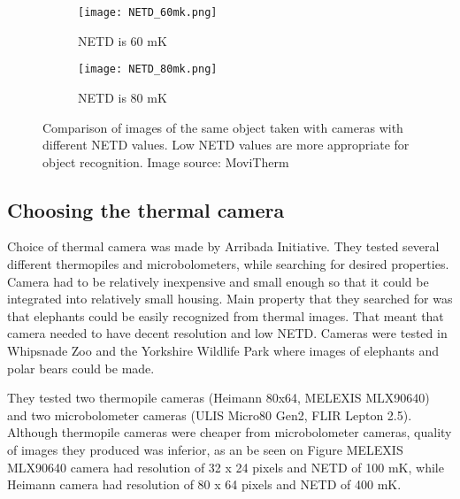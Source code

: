\begin{figure}[h]
    \begin{subfigure}{0.5\textwidth}
        \centering
        \texttt{[image: NETD\_60mk.png]} 
        \caption{NETD is 60 \si{\milli\kelvin}}
        \label{NETD_60mk}
    \end{subfigure}
    \begin{subfigure}{0.5\textwidth}
        \centering
        \texttt{[image: NETD\_80mk.png]}
        \caption{NETD is 80 \si{\milli\kelvin}}
        \label{NETD_80mk}
    \end{subfigure}

    \caption{Comparison of images of the same object taken with cameras with different NETD values. Low NETD values are more appropriate for object recognition. Image source: MoviTherm \cite{NETD}}
    \label{NETD}
\end{figure}


\subsection{ Choosing the thermal camera}

Choice of thermal camera was made by Arribada Initiative\cite{thermal_comparison}.
They tested several different thermopiles and microbolometers, while searching for desired properties.
Camera had to be relatively inexpensive and small enough so that it could be integrated into relatively small housing.
Main property that they searched for was that elephants could be easily recognized from thermal images.
That meant that camera needed to have decent resolution and low NETD.
Cameras were tested in Whipsnade Zoo and the Yorkshire Wildlife Park where images of elephants and polar bears could be made.

They tested two thermopile cameras (Heimann 80x64, MELEXIS MLX90640) and two microbolometer cameras (ULIS Micro80 Gen2, FLIR Lepton 2.5).
Although thermopile cameras were cheaper from microbolometer cameras, quality of images they produced was inferior, as an be seen on Figure \cite{}
MELEXIS MLX90640 camera had resolution of 32 x 24 pixels and NETD of 100 \si{\milli\kelvin}, while Heimann camera had resolution of 80 x 64 pixels and NETD of 400 \si{\milli\kelvin}.
\newline

